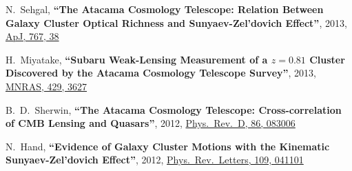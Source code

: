 \documentclass{article}
\def\myself{\textbf{\color{red} C.~Sif\'on}}
\def\apj{ApJ}
\def\mnras{MNRAS}
\def\prd{Phys.\ Rev.\ D}
\def\prl{Phys.\ Rev.\ Letters}
\newcommand{\paper}[1]{\textbf{``#1''}}
\begin{document}
\begin{etaremune}
\item
N.~Sehgal, 
\paper{The Atacama Cosmology Telescope: Relation Between Galaxy Cluster Optical Richness and
Sunyaev-Zel'dovich Effect},
2013, \href{http://adsabs.harvard.edu/adsabs/abs/2013ApJ...767...38S}{\apj, 767, 38}

\item
H.~Miyatake, 
\paper{Subaru Weak-Lensing Measurement of a $z=0.81$ Cluster Discovered by the Atacama Cosmology
Telescope Survey},
2013, \href{http://adsabs.harvard.edu/adsabs/abs/2013MNRAS.429.3627M}{\mnras, 429, 3627}

\item
B.~D.~Sherwin, 
\paper{The Atacama Cosmology Telescope: Cross-correlation of CMB Lensing and Quasars},
2012, \href{http://adsabs.harvard.edu/adsabs/abs/2012PhRvD..86h3006S}{\prd, 86, 083006}

\item
N.~Hand, 
\paper{Evidence of Galaxy Cluster Motions with the Kinematic Sunyaev-Zel'dovich Effect}, 
2012, \href{http://adsabs.harvard.edu/adsabs/abs/2012PhRvL.109d1101H}{\prl, 109, 041101}


\end{etaremune}
\end{document}
